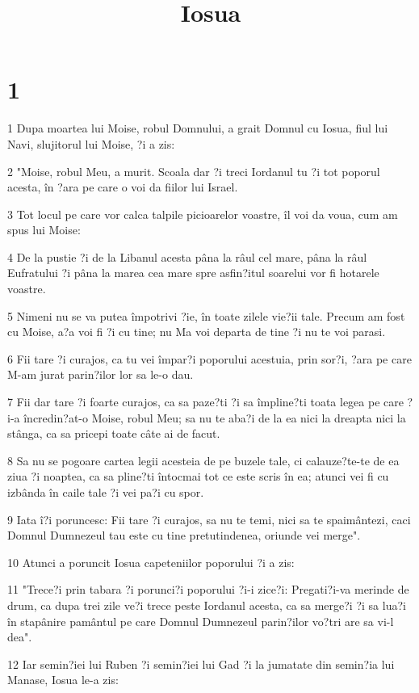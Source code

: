 

\title{Iosua}


\chapter{1}

\par 1 Dupa moartea lui Moise, robul Domnului, a grait Domnul cu Iosua, fiul lui Navi, slujitorul lui Moise, ?i a zis:
\par 2 "Moise, robul Meu, a murit. Scoala dar ?i treci Iordanul tu ?i tot poporul acesta, în ?ara pe care o voi da fiilor lui Israel.
\par 3 Tot locul pe care vor calca talpile picioarelor voastre, îl voi da voua, cum am spus lui Moise:
\par 4 De la pustie ?i de la Libanul acesta pâna la râul cel mare, pâna la râul Eufratului ?i pâna la marea cea mare spre asfin?itul soarelui vor fi hotarele voastre.
\par 5 Nimeni nu se va putea împotrivi ?ie, în toate zilele vie?ii tale. Precum am fost cu Moise, a?a voi fi ?i cu tine; nu Ma voi departa de tine ?i nu te voi parasi.
\par 6 Fii tare ?i curajos, ca tu vei împar?i poporului acestuia, prin sor?i, ?ara pe care M-am jurat parin?ilor lor sa le-o dau.
\par 7 Fii dar tare ?i foarte curajos, ca sa paze?ti ?i sa împline?ti toata legea pe care ?i-a încredin?at-o Moise, robul Meu; sa nu te aba?i de la ea nici la dreapta nici la stânga, ca sa pricepi toate câte ai de facut.
\par 8 Sa nu se pogoare cartea legii acesteia de pe buzele tale, ci calauze?te-te de ea ziua ?i noaptea, ca sa pline?ti întocmai tot ce este scris în ea; atunci vei fi cu izbânda în caile tale ?i vei pa?i cu spor.
\par 9 Iata î?i poruncesc: Fii tare ?i curajos, sa nu te temi, nici sa te spaimântezi, caci Domnul Dumnezeul tau este cu tine pretutindenea, oriunde vei merge".
\par 10 Atunci a poruncit Iosua capeteniilor poporului ?i a zis:
\par 11 "Trece?i prin tabara ?i porunci?i poporului ?i-i zice?i: Pregati?i-va merinde de drum, ca dupa trei zile ve?i trece peste Iordanul acesta, ca sa merge?i ?i sa lua?i în stapânire pamântul pe care Domnul Dumnezeul parin?ilor vo?tri are sa vi-l dea".
\par 12 Iar semin?iei lui Ruben ?i semin?iei lui Gad ?i la jumatate din semin?ia lui Manase, Iosua le-a zis:
